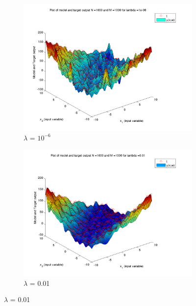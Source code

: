 \documentclass{article}
\begin{document}
\begin{figure}[H]

\begin{subfigure}{.5\textwidth}
\centering
\includegraphics[width=\linewidth]{D2/Varyinglambda_N1000M1000lambda1e-06}
\caption{$\lambda$ = $10^{-6}$}
\end{subfigure}
\begin{subfigure}{.5\textwidth}
\includegraphics[width=\linewidth]{D2/Varyinglambda_N1000M1000lambda0_01}
\caption{$\lambda$ = 0.01}
\end{subfigure}



\end{figure}
\end{document}
